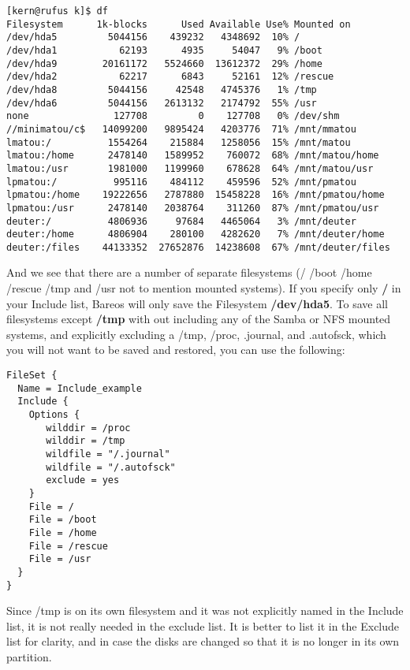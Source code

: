 \footnotesize
\begin{verbatim}
[kern@rufus k]$ df
Filesystem      1k-blocks      Used Available Use% Mounted on
/dev/hda5         5044156    439232   4348692  10% /
/dev/hda1           62193      4935     54047   9% /boot
/dev/hda9        20161172   5524660  13612372  29% /home
/dev/hda2           62217      6843     52161  12% /rescue
/dev/hda8         5044156     42548   4745376   1% /tmp
/dev/hda6         5044156   2613132   2174792  55% /usr
none               127708         0    127708   0% /dev/shm
//minimatou/c$   14099200   9895424   4203776  71% /mnt/mmatou
lmatou:/          1554264    215884   1258056  15% /mnt/matou
lmatou:/home      2478140   1589952    760072  68% /mnt/matou/home
lmatou:/usr       1981000   1199960    678628  64% /mnt/matou/usr
lpmatou:/          995116    484112    459596  52% /mnt/pmatou
lpmatou:/home    19222656   2787880  15458228  16% /mnt/pmatou/home
lpmatou:/usr      2478140   2038764    311260  87% /mnt/pmatou/usr
deuter:/          4806936     97684   4465064   3% /mnt/deuter
deuter:/home      4806904    280100   4282620   7% /mnt/deuter/home
deuter:/files    44133352  27652876  14238608  67% /mnt/deuter/files
\end{verbatim}
\normalsize

And we see that there are a number of separate filesystems (/ /boot
/home /rescue /tmp and /usr not to mention mounted systems).
If you specify only {\bf /} in your Include list, Bareos will only save the
Filesystem {\bf /dev/hda5}. To save all filesystems except {\bf /tmp} with
out including any of the Samba or NFS mounted systems, and explicitly
excluding a /tmp, /proc, .journal, and .autofsck, which you will not want to
be saved and restored, you can use the following:

\footnotesize
\begin{verbatim}
FileSet {
  Name = Include_example
  Include {
    Options {
       wilddir = /proc
       wilddir = /tmp
       wildfile = "/.journal"
       wildfile = "/.autofsck"
       exclude = yes
    }
    File = /
    File = /boot
    File = /home
    File = /rescue
    File = /usr
  }
}
\end{verbatim}
\normalsize

Since /tmp is on its own filesystem and it was not explicitly named in the
Include list, it is not really needed in the exclude list. It is better to
list it in the Exclude list for clarity, and in case the disks are changed so
that it is no longer in its own partition.


